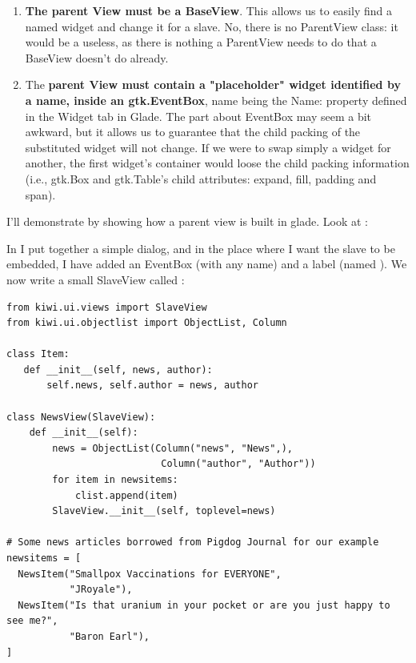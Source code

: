\documentclass[a4paper]{howto}
\begin{document}
\begin{enumerate}
\item {\bf The parent View must be a BaseView}. This allows us to
easily find a named widget and change it for a slave. No, there is no
ParentView class: it would be a useless, as there is nothing a
ParentView needs to do that a BaseView doesn't do already.
\item The {\bf parent View must contain a "placeholder" widget
identified by a name, inside an gtk.EventBox}, name being the Name: property
defined in the Widget tab in Glade. The part about EventBox may seem a
bit awkward, but it allows us to guarantee that the child packing of the
substituted widget will not change. If we were to swap simply a widget
for another, the first widget's container would loose the child packing
information (i.e., gtk.Box and gtk.Table's child attributes: expand, fill,
padding and span).
\end{enumerate}

I'll demonstrate by showing how a parent view is built in glade. Look at
:


In  I put together a simple dialog, and in the place where
I want the slave to be embedded, I have added an EventBox (with any
name) and a label (named ). We now write a
small SlaveView called :

\begin{verbatim}
from kiwi.ui.views import SlaveView
from kiwi.ui.objectlist import ObjectList, Column

class Item:
   def __init__(self, news, author):
       self.news, self.author = news, author

class NewsView(SlaveView):
    def __init__(self):
        news = ObjectList(Column("news", "News",),
                           Column("author", "Author"))
        for item in newsitems:
            clist.append(item)
        SlaveView.__init__(self, toplevel=news)

# Some news articles borrowed from Pigdog Journal for our example
newsitems = [
  NewsItem("Smallpox Vaccinations for EVERYONE",
           "JRoyale"),
  NewsItem("Is that uranium in your pocket or are you just happy to see me?",
           "Baron Earl"),
]

\end{verbatim}
\end{document}
